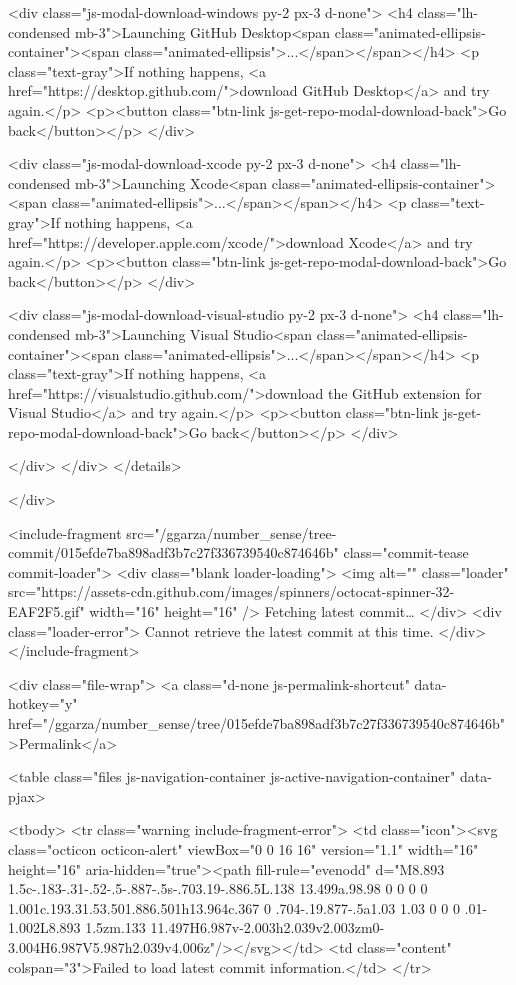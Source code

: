       <div class="js-modal-download-windows py-2 px-3 d-none">
        <h4 class="lh-condensed mb-3">Launching GitHub Desktop<span class="animated-ellipsis-container"><span class="animated-ellipsis">...</span></span></h4>
        <p class="text-gray">If nothing happens, <a href="https://desktop.github.com/">download GitHub Desktop</a> and try again.</p>
        <p><button class="btn-link js-get-repo-modal-download-back">Go back</button></p>
      </div>

      <div class="js-modal-download-xcode py-2 px-3 d-none">
        <h4 class="lh-condensed mb-3">Launching Xcode<span class="animated-ellipsis-container"><span class="animated-ellipsis">...</span></span></h4>
        <p class="text-gray">If nothing happens, <a href="https://developer.apple.com/xcode/">download Xcode</a> and try again.</p>
        <p><button class="btn-link js-get-repo-modal-download-back">Go back</button></p>
      </div>

      <div class="js-modal-download-visual-studio py-2 px-3 d-none">
        <h4 class="lh-condensed mb-3">Launching Visual Studio<span class="animated-ellipsis-container"><span class="animated-ellipsis">...</span></span></h4>
        <p class="text-gray">If nothing happens, <a href="https://visualstudio.github.com/">download the GitHub extension for Visual Studio</a> and try again.</p>
        <p><button class="btn-link js-get-repo-modal-download-back">Go back</button></p>
      </div>

    </div>
  </div>
</details>

</div>


  

<include-fragment src="/ggarza/number_sense/tree-commit/015efde7ba898adf3b7c27f336739540c874646b" class="commit-tease commit-loader">
  <div class="blank loader-loading">
      <img alt="" class="loader" src="https://assets-cdn.github.com/images/spinners/octocat-spinner-32-EAF2F5.gif" width="16" height="16" />
      Fetching latest commit…
  </div>
  <div class="loader-error">
    Cannot retrieve the latest commit at this time.
  </div>
</include-fragment>


<div class="file-wrap">
  <a class="d-none js-permalink-shortcut" data-hotkey="y" href="/ggarza/number_sense/tree/015efde7ba898adf3b7c27f336739540c874646b">Permalink</a>

  <table class="files js-navigation-container js-active-navigation-container" data-pjax>


    <tbody>
      <tr class="warning include-fragment-error">
        <td class="icon"><svg class="octicon octicon-alert" viewBox="0 0 16 16" version="1.1" width="16" height="16" aria-hidden="true"><path fill-rule="evenodd" d="M8.893 1.5c-.183-.31-.52-.5-.887-.5s-.703.19-.886.5L.138 13.499a.98.98 0 0 0 0 1.001c.193.31.53.501.886.501h13.964c.367 0 .704-.19.877-.5a1.03 1.03 0 0 0 .01-1.002L8.893 1.5zm.133 11.497H6.987v-2.003h2.039v2.003zm0-3.004H6.987V5.987h2.039v4.006z"/></svg></td>
        <td class="content" colspan="3">Failed to load latest commit information.</td>
      </tr>

